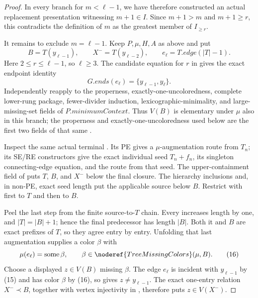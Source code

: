 \begin{proof}
In every branch for \(m<\ell-1\), we have therefore constructed an actual
replacement presentation witnessing \(m+1\in I\).  Since \(m+1>m\) and
\(m+1\geq r\), this contradicts the definition of \(m\) as the greatest
member of \(I_{\geq r}\).

It remains to exclude \(m=\ell-1\).  Keep \(P,\mu,H,A\) as above and put
\[
 B=T(y_{\ell-1}),\qquad X^-=T(y_{\ell-2}),\qquad
 e_\ell=T.\mathit{edge}(|T|-1).                                \tag{14}
\]
Here \(2\leq r\leq\ell-1\), so \(\ell\geq3\).  The candidate equation for
\(r\) in  gives the exact endpoint identity
\[
                 G.\mathit{ends}(e_\ell)=\{y_{\ell-1},y_\ell\}. \tag{15}
\]
Independently reapply
 to the properness,
exactly-one-uncoloredness, complete lower-rung package, fewer-divider
induction, lexicographic-minimality, and large-missing-set fields of
\(P.\mathit{minimumContext}\).  Thus \(V(B)\) is elementary under \(\mu\)
also in this branch; the properness and exactly-one-uncoloredness used
below are the first two fields of that same
.

Inspect the same actual terminal .  Its PE
 gives a \(\mu\)-augmentation route from \(T_n\);
its SE/RE constructors give the exact individual seed \(T_n+f_n\), its
singleton connecting-edge equation, and the route from that seed.  The
upper-containment field of  puts \(T\),
\(B\), and \(X^-\) below the final closure.  The hierarchy inclusions and,
in non-PE, exact seed length put the applicable source below \(B\).
Restrict with  first to
\(T\) and then to \(B\).

Peel the last step from the finite source-to-\(T\) chain.  Every
 increases length by one, and
\(|T|=|B|+1\); hence the final predecessor has length \(|B|\).  Both it and
\(B\) are exact prefixes of \(T\), so they agree entry by entry.  Unfolding
that last augmentation supplies a color \(\beta\) with
\[
 \mu(e_\ell)=\operatorname{some}\beta,\qquad
 \beta\in\noderef{TreeMissingColors}(\mu,B).                   \tag{16}
\]
Choose a displayed \(z\in V(B)\) missing \(\beta\).  The edge \(e_\ell\)
is incident with \(y_{\ell-1}\) by (15) and has color \(\beta\) by (16), so
 gives \(z\ne y_{\ell-1}\).  The exact one-entry
relation \(X^-\prec B\), together with vertex injectivity in
, therefore puts \(z\in V(X^-)\).


\end{proof}
